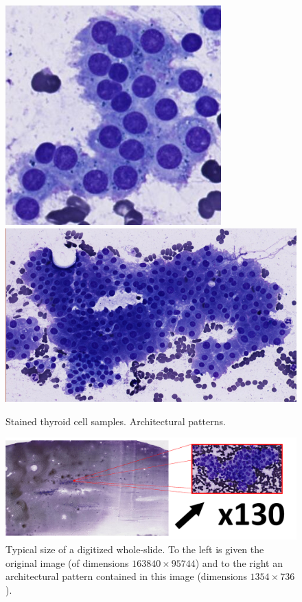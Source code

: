 \begin{figure}
{		\includegraphics[scale=0.5]{image/normal_pattern_1.png}
		\includegraphics[scale=0.5]{image/normal_pattern_2.png}
		\label{sfig:norm_patterns}
	}
	\caption{Stained thyroid cell samples. Architectural patterns.}
	\label{fig:intro_pattern_ex}
\end{figure}

\begin{figure}
	\center
	\includegraphics[scale=0.2]{image/whole-slide-dim.png}
	\caption{Typical size of a digitized whole-slide. To the left is given the original image (of dimensions $163840 \times 95744$) and to the right an architectural pattern contained in this image (dimensions $1354 \times 736$).}
	\label{fig:prob_dim_illus}
\end{figure}

